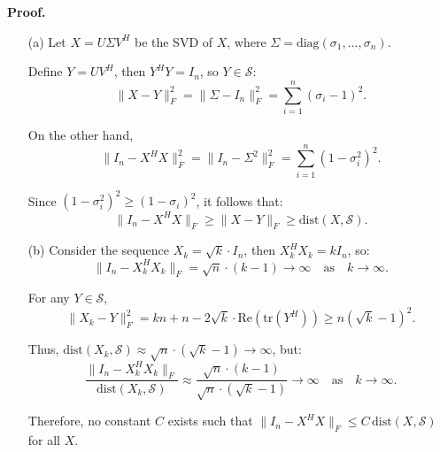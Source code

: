 \documentclass[a4paper, 11pt]{article}
\newenvironment{solution}
    {\textbf{Proof.}}
    {}
\begin{document}
\begin{solution}
\begin{enumerate}
	\item[(a)]
	Let \( X = U \Sigma V^H \) be the SVD of \( X \), where \( \Sigma = \text{diag}(\sigma_1, \ldots, \sigma_n) \). 
	
	Define \( Y = U V^H \), then \( Y^H Y = I_n \), so \( Y \in \mathcal{S} \):
	$$
	\|X - Y\|_F^2 = \|\Sigma - I_n\|_F^2 = \sum_{i=1}^n (\sigma_i - 1)^2.
	$$
	
	On the other hand,
	$$
	\|I_n - X^H X\|_F^2 = \|I_n - \Sigma^2\|_F^2 = \sum_{i=1}^n (1 - \sigma_i^2)^2.
	$$
	
	Since \( (1 - \sigma_i^2)^2 \geq (1 - \sigma_i)^2 \), it follows that:
	$$
	\|I_n - X^H X\|_F \geq \|X - Y\|_F \geq \text{dist}(X, \mathcal{S}).
	$$
	
\item[(b)]
	Consider the sequence \( X_k = \sqrt{k} \cdot I_n \), then \( X_k^H X_k = k I_n \), so:
	$$
	\|I_n - X_k^H X_k\|_F = \sqrt{n} \cdot (k - 1) \to \infty \quad \text{as} \quad k \to \infty.
	$$
	
	For any \( Y \in \mathcal{S} \),
	$$
	\|X_k - Y\|_F^2 = k n + n - 2\sqrt{k} \cdot \text{Re}(\text{tr}(Y^H)) \geq n (\sqrt{k} - 1)^2.
	$$
	
	Thus, \( \text{dist}(X_k, \mathcal{S}) \approx \sqrt{n} \cdot (\sqrt{k} - 1) \to \infty \), but:
	$$
	\frac{\|I_n - X_k^H X_k\|_F}{\text{dist}(X_k, \mathcal{S})} \approx \frac{\sqrt{n} \cdot (k - 1)}{\sqrt{n} \cdot (\sqrt{k} - 1)} \to \infty \quad \text{as} \quad k \to \infty.
	$$
	
	Therefore, no constant \( C \) exists such that \( \|I_n - X^H X\|_F \leq C \, \text{dist}(X, \mathcal{S}) \) for all \( X \).
		\end{enumerate}
\end{solution}
\end{document}
